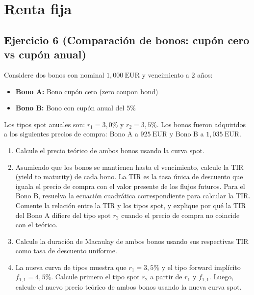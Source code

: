 \documentclass[12pt,a4paper]{article}
\newcommand{\EUR}[1]{\ensuremath{#1~\text{EUR}}}
\newenvironment{ejercicio}[1]{\subsection*{Ejercicio #1}}{}
\begin{document}
 \section{Renta fija}

 \begin{ejercicio}{6 (Comparación de bonos: cupón cero vs cupón anual)}
 Considere dos bonos con nominal \EUR{1{,}000} y vencimiento a 2 años:
 \begin{itemize}
   \item \textbf{Bono A:} Bono cupón cero (zero coupon bond)
   \item \textbf{Bono B:} Bono con cupón anual del \(5\%\)
 \end{itemize}
 Los tipos spot anuales son: \(r_1=3{,}0\%\) y \(r_2=3{,}5\%\). Los bonos fueron adquiridos a los siguientes precios de compra: Bono A a \EUR{925} y Bono B a \EUR{1{,}035}.
 \begin{enumerate}[label=\alph*)]
   \item Calcule el precio teórico de ambos bonos usando la curva spot.
  \item Asumiendo que los bonos se mantienen hasta el vencimiento, calcule la TIR (yield to maturity) de cada bono. La TIR es la tasa única de descuento que iguala el precio de compra con el valor presente de los flujos futuros. Para el Bono B, resuelva la ecuación cuadrática correspondiente para calcular la TIR. Comente la relación entre la TIR y los tipos spot, y explique por qué la TIR del Bono A difiere del tipo spot \(r_2\) cuando el precio de compra no coincide con el teórico.
   \item Calcule la duración de Macaulay de ambos bonos usando sus respectivas TIR como tasa de descuento uniforme.
   \item La nueva curva de tipos muestra que \(r_1 = 3{,}5\%\) y el tipo forward implícito \(f_{1,1} = 4{,}5\%\). Calcule primero el tipo spot \(r_2\) a partir de \(r_1\) y \(f_{1,1}\). Luego, calcule el nuevo precio teórico de ambos bonos usando la nueva curva spot.
 \end{enumerate}
 \end{ejercicio}
\end{document}
